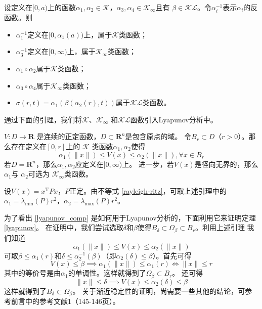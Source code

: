 \begin{lemma}\label{klcomp}
  设定义在$[0,a)$上的函数$\alpha_{1},\alpha_{2}\in\mathcal{K}$，$\alpha_{3},\alpha_{4}\in\mathcal{K}_{\infty}$且有
  $\beta\in\mathcal{KL}$。令$\alpha_{i}^{-1}$表示$\alpha_{i}$的反函数。则
  \begin{itemize}[leftmargin=1em]
    \item $\alpha_{1}^{-1}$定义在$[0,\alpha_{1}(a))$上，属于$\mathcal{K}$类函数；
    \item $\alpha_{3}^{-1}$定义在$[0,\infty)$上，属于$\mathcal{K}_\infty$类函数；
    \item $\alpha_{1} \circ\alpha_{2}$属于$\mathcal{K}$类函数；
    \item $\alpha_{3} \circ\alpha_{4}$属于$\mathcal{K}_\infty$类函数；
    \item $\sigma(r,t)=\alpha_{1}(\beta(\alpha_{2}(r),t)) $属于$\mathcal{K}\mathcal{L}$类函数。
  \end{itemize}
\end{lemma}

通过下面的引理，我们将$\mathcal{K}$、$\mathcal{K}_\infty$ 和$\mathcal{K}\mathcal{L}$函数引入Lyapunov分析中。

\begin{lemma}\label{lyapunov_comp}
  $V : D \rightarrow \mathbf{R}$ 是连续的正定函数，$D\subset\mathbf{R}^n$是包含原点的域。
  令$B_r\subset D$（$r>0$）。那么存在定义在$[0,r]$上的
  $\mathcal{K}$ 类函数$\alpha_1,\alpha_2$使得
  \[ \alpha_1 (\| x \|) \leq V (x) \leq \alpha_2 (\| x \|), \forall x \in B_r \]
  若$D =\mathbf{R}^n$，那么$\alpha_1,\alpha_2$应定义在$[0,\infty)$上。
  进一步，若$V(x)$是径向无界的，那么 $\alpha_1$与 $\alpha_2$可选为 $\mathcal{K}_{\infty}$类函数。
\end{lemma}

\begin{example}
  设$V (x) = x^\mathrm{T} P  x$，$P$正定。由不等式 \ref{rayleigh-ritz}，可取上述引理中的$\alpha_1=\lambda_{\min} (P)r^2$，$\alpha_2=\lambda_{\max} (P)r^2$。
\end{example}
为了看出 \ref{lyapunov_comp} 是如何用于Lyapunov分析的，下面利用它来证明定理 \ref{lyapunov}。
在证明中，我们尝试选取$\delta$和$\beta$使得$B_\delta\subset\Omega_\beta\subset B_r$。利用上述引理
我们知道\[\alpha_1 (\| x \|) \leq V (x) \leq \alpha_2 (\| x \|)\]
可取$\beta\le\alpha_1(r)$和$\delta\le\alpha_2^{-1}(\beta)$（即$\alpha_2(\delta)\le\beta$）。首先可得
\[V(x)\le\beta\implies\alpha_1(\|x\|)\le\alpha_1(r)\iff \|x\|\le r\]
其中的等价号是由$\alpha_1$的单调性。这样就得到了$\Omega_\beta\subset B_r$。
还可得\[\|x\|\le\delta\implies V(x)\le\alpha_2(\delta)\le\beta\]
这样就得到了$B_\delta\subset\Omega_\beta$。
关于渐近稳定性的证明，尚需要一些其他的结论，可参考前言中的参考文献1（145-146页）。

